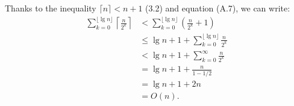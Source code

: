 Thanks to the inequality $\lceil n\rceil<n+1$ (3.2) and equation (A.7), we can write:
\begin{align*}
	\sum_{k=0}^{\lfloor\lg n\rfloor}\left\lceil\frac{n}{2^k}\right\rceil &< \sum_{k=0}^{\lfloor\lg n\rfloor} \left(\frac{n}{2^k}+1\right) \\
    &\le \lg n+1+\sum_{k=0}^{\lfloor\lg n\rfloor}\frac{n}{2^k} \\
    &< \lg n+1+\sum_{k=0}^\infty\frac{n}{2^k} \\
	&= \lg n+1+\frac{n}{1-1/2} \\
    &= \lg n+1+2n \\
    &= O(n).
\end{align*}
